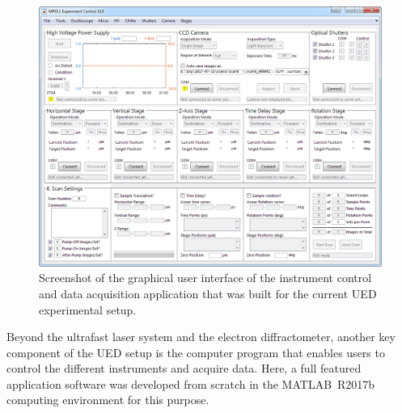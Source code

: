 \begin{figure}[ht!]
  \centering
  \includegraphics[width = \textwidth]{Figures/fig_ch2_MP011-app.png}
  \caption{
    Screenshot of the graphical user interface of the instrument control and data acquisition application
    that was built for the current UED experimental setup.
  }
  \label{fig: MP011-app}
\end{figure}
%
Beyond the ultrafast laser system and the electron diffractometer,
another key component of the UED setup is the computer program that
enables users to control the different instruments and acquire data.
Here, a full featured application software was developed from scratch
in the \textsc{MATLAB}~R2017b computing environment for this purpose.

